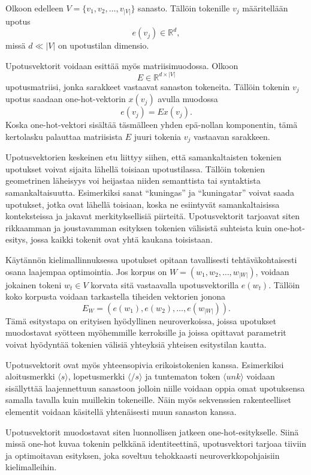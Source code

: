 Olkoon edelleen \(V = \{v_1, v_2, \dots, v_{|V|}\}\) sanasto. Tällöin tokenille
\(v_j\) määritellään upotus
\[
  e(v_j) \in \mathbb{R}^d,
\]
missä \(d \ll |V|\) on upotustilan dimensio.

Upotusvektorit voidaan esittää myös matriisimuodossa. Olkoon
\[
  E \in \mathbb{R}^{d \times |V|}
\]
upotusmatriisi, jonka sarakkeet vastaavat sanaston tokeneita. Tällöin tokenin
\(v_j\) upotus saadaan one-hot-vektorin \(x(v_j)\) avulla muodossa
\[
  e(v_j) = E x(v_j).
\]
Koska one-hot-vektori sisältää täsmälleen yhden epä-nollan komponentin, tämä
kertolasku palauttaa matriisista \(E\) juuri tokenia \(v_j\) vastaavan
sarakkeen.

Upotusvektorien keskeinen etu liittyy siihen, että samankaltaisten tokenien
upotukset voivat sijaita lähellä toisiaan upotustilassa. Tällöin tokenien
geometrinen läheisyys voi heijastaa niiden semanttista tai syntaktista
samankaltaisuutta. Esimerkiksi sanat ``kuningas'' ja ``kuningatar'' voivat saada
upotukset, jotka ovat lähellä toisiaan, koska ne esiintyvät samankaltaisissa
konteksteissa ja jakavat merkityksellisiä piirteitä. Upotusvektorit tarjoavat
siten rikkaamman ja joustavamman esityksen tokenien välisistä suhteista kuin
one-hot-esitys, jossa kaikki tokenit ovat yhtä kaukana toisistaan.

Käytännön kielimallinnuksessa upotukset opitaan tavallisesti tehtäväkohtaisesti
osana laajempaa optimointia. Jos korpus on
\(W = (w_1, w_2, \dots, w_{|W|})\), voidaan jokainen tokeni \(w_t \in V\)
korvata sitä vastaavalla upotusvektorilla \(e(w_t)\). Tällöin koko korpusta
voidaan tarkastella tiheiden vektorien jonona
\[
  E_W = (e(w_1), e(w_2), \dots, e(w_{|W|})).
\]
Tämä esitystapa on erityisen hyödyllinen neuroverkoissa, joissa upotukset
muodostavat syötteen myöhemmille kerroksille ja joissa opittavat parametrit
voivat hyödyntää tokenien välisiä yhteyksiä yhteisen esitystilan kautta.

Upotusvektorit ovat myös yhteensopivia erikoistokenien kanssa. Esimerkiksi
aloitusmerkki \(\langle s \rangle\), lopetusmerkki \(\langle /s \rangle\) ja
tuntematon token \(\langle unk \rangle\) voidaan sisällyttää laajennettuun
sanastoon jolloin niille voidaan oppia omat upotuksensa samalla tavalla kuin muillekin
tokeneille. Näin myös sekvenssien rakenteelliset elementit voidaan käsitellä
yhtenäisesti muun sanaston kanssa.

Upotusvektorit muodostavat siten luonnollisen jatkeen one-hot-esitykselle.
Siinä missä one-hot kuvaa tokenin pelkkänä identiteettinä, upotusvektori tarjoaa
tiiviin ja optimoitavan esityksen, joka soveltuu tehokkaasti
neuroverkkopohjaisiin kielimalleihin.

